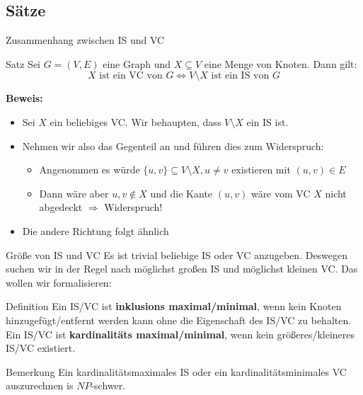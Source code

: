 \subsection{Sätze}
\begin{frame}{Zusammenhang zwischen IS und VC}
	\begin{block}{Satz}
		Sei $G=(V,E)$ eine Graph und $X\subseteq V$ eine Menge von Knoten. Dann gilt:
		\[X\text{ ist ein VC von $G$} \Longleftrightarrow V\setminus X\text{ ist ein IS von $G$}\]
	\end{block}
	\pause
	\textbf{Beweis:}
	\begin{itemize}
		\item Sei $X$ ein beliebiges VC. Wir behaupten, dass $V\setminus X$ ein IS ist.
		\item Nehmen wir also das Gegenteil an und führen dies zum Widerspruch:
		\pause
		\begin{itemize}
			\item Angenommen es würde $\{u,v\}\subseteq V\setminus X, u\neq v$ existieren mit $(u,v)\in E$
			\item Dann wäre aber $u,v\notin X$ und die Kante $(u,v)$ wäre vom VC $X$ nicht abgedeckt $\Rightarrow$ Widerspruch!
		\end{itemize}
		\pause
		\item Die andere Richtung folgt ähnlich
	\end{itemize}
\end{frame}
\begin{frame}{Größe von IS und VC}
	Es ist trivial beliebige IS oder VC anzugeben. Deswegen suchen wir in der Regel nach möglichst großen IS und möglichst kleinen VC. Das wollen wir formalisieren:
	\pause
	\begin{block}{Definition}
		Ein IS/VC ist \textbf{inklusions maximal/minimal}, wenn kein Knoten hinzugefügt/entfernt werden kann ohne die Eigenschaft des IS/VC zu behalten.\\
		\pause
		Ein IS/VC ist \textbf{kardinalitäts maximal/minimal}, wenn kein größeres/kleineres IS/VC existiert.
	\end{block}
	\pause
	\begin{block}{Bemerkung}
		Ein kardinalitätsmaximales IS oder ein kardinalitätsminimales VC auszurechnen is $NP$-schwer.
	\end{block}
\end{frame}
